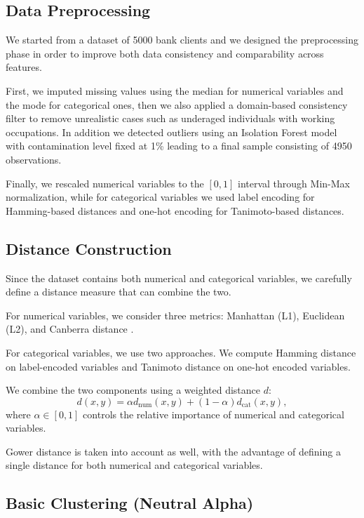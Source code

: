 \documentclass[9pt,a4paper,twocolumn,twoside]{rho-class/rho}
\begin{document}
\subsection{Data Preprocessing}
We started from a dataset of 5000 bank clients and we designed the preprocessing phase in order to improve both data consistency and comparability across features.

First, we imputed missing values using the median for numerical variables and the mode for categorical ones, then we also applied a domain-based consistency filter to remove unrealistic cases such as underaged individuals with working occupations. In addition we detected outliers using an Isolation Forest model with contamination level fixed at 1\% leading to a final sample consisting of 4950 observations.

Finally, we rescaled numerical variables to the $[0,1]$ interval through Min-Max normalization, while for categorical variables we used label encoding for Hamming-based distances and one-hot encoding for Tanimoto-based distances.

\subsection{Distance Construction}
Since the dataset contains both numerical and categorical variables, we carefully define a distance measure that can combine the two.

For numerical variables, we consider three metrics: Manhattan (L1), Euclidean (L2), and Canberra distance \cite{Lance1967}.

For categorical variables, we use two approaches. We compute Hamming distance \cite{Hamming1950} on label-encoded variables and Tanimoto distance \cite{Tanimoto1958} on one-hot encoded variables.

We combine the two components using a weighted distance $d$:
\newline
\[
d(x,y) = \alpha d_{\mathrm{num}}(x,y) + (1-\alpha)d_{\mathrm{cat}}(x,y),
\]
where $\alpha \in [0,1]$ controls the relative importance of numerical and categorical variables.

Gower distance \cite{Gower1971} is taken into account as well, with the advantage of defining a single distance for both numerical and categorical variables.

\subsection{Basic Clustering (Neutral Alpha)}
\end{document}
